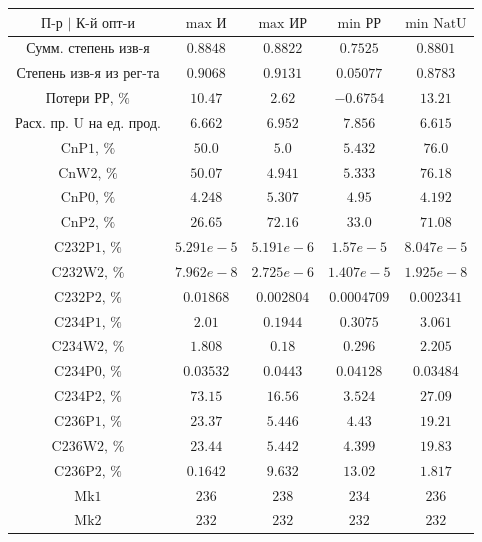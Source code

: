 \begin{table}
    \begin{tabular}{ccccc}
        $\text{П-р | К-й опт-и}$ & $\text{max И}$ & $\text{max ИР}$ & $\text{min РР}$ & $\text{min NatU}$\\ \hline
        $\text{Сумм. степень изв-я}$ & $0.8848$ & $0.8822$ & $0.7525$ & $0.8801$\\ \hline
        $\text{Степень изв-я из рег-та}$ & $0.9068$ & $0.9131$ & $0.05077$ & $0.8783$\\ \hline
        $\text{Потери РР, \%}$ & $10.47$ & $2.62$ & $-0.6754$ & $13.21$\\ \hline
        $\text{Расх. пр. U на ед. прод.}$ & $6.662$ & $6.952$ & $7.856$ & $6.615$\\ \hline
        $\text{CnP1, \%}$ & $50.0$ & $5.0$ & $5.432$ & $76.0$\\ \hline
        $\text{CnW2, \%}$ & $50.07$ & $4.941$ & $5.333$ & $76.18$\\ \hline
        $\text{CnP0, \%}$ & $4.248$ & $5.307$ & $4.95$ & $4.192$\\ \hline
        $\text{CnP2, \%}$ & $26.65$ & $72.16$ & $33.0$ & $71.08$\\ \hline
        $\text{C232P1, \%}$ & $5.291e-5$ & $5.191e-6$ & $1.57e-5$ & $8.047e-5$\\ \hline
        $\text{C232W2, \%}$ & $7.962e-8$ & $2.725e-6$ & $1.407e-5$ & $1.925e-8$\\ \hline
        $\text{C232P2, \%}$ & $0.01868$ & $0.002804$ & $0.0004709$ & $0.002341$\\ \hline
        $\text{C234P1, \%}$ & $2.01$ & $0.1944$ & $0.3075$ & $3.061$\\ \hline
        $\text{C234W2, \%}$ & $1.808$ & $0.18$ & $0.296$ & $2.205$\\ \hline
        $\text{C234P0, \%}$ & $0.03532$ & $0.0443$ & $0.04128$ & $0.03484$\\ \hline
        $\text{C234P2, \%}$ & $73.15$ & $16.56$ & $3.524$ & $27.09$\\ \hline
        $\text{C236P1, \%}$ & $23.37$ & $5.446$ & $4.43$ & $19.21$\\ \hline
        $\text{C236W2, \%}$ & $23.44$ & $5.442$ & $4.399$ & $19.83$\\ \hline
        $\text{C236P2, \%}$ & $0.1642$ & $9.632$ & $13.02$ & $1.817$\\ \hline
        $\text{Mk1}$ & $236$ & $238$ & $234$ & $236$\\ \hline
        $\text{Mk2}$ & $232$ & $232$ & $232$ & $232$\\ \hline

\end{tabular}
\end{table}
